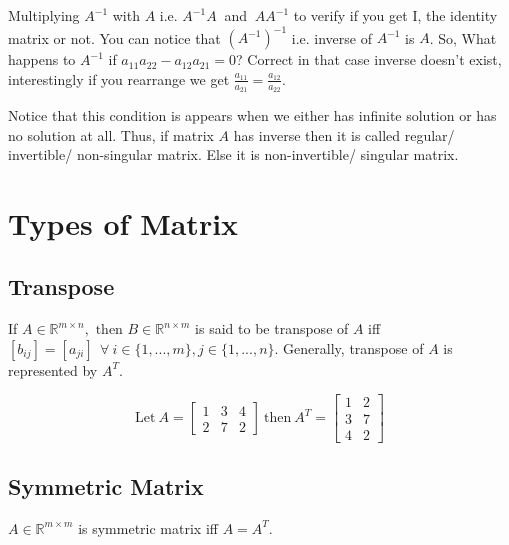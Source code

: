 \documentclass{article}
\begin{document}
Multiplying \( A^{-1} \) with \(A\) i.e. \( A^{-1} A ~ \) and \( ~ A  A^{-1} \) to verify if you get I, the identity matrix or not. You can notice that \((A^{-1})^{-1}\) i.e. inverse of \(A^{-1}\) is \(A\). So, What happens to \(A^{-1}\) if \(a_{11}a_{22} - a_{12}a_{21} = 0\)? Correct in that case inverse doesn't exist, interestingly if you rearrange we get \(\frac{a_{11}}{a_{21}} = \frac{a_{12}}{a_{22}}\).

Notice that this condition is appears when we either has infinite solution or has no solution at all. Thus, if matrix \(A\) has inverse then it is called regular/ invertible/ non-singular matrix. Else it is non-invertible/ singular matrix.

\section{Types of Matrix}
\subsection{Transpose}
If \(A \in \mathbb{R} ^{m \times n}, \text{ then } B \in \mathbb{R} ^{n\times m}\) is said to be transpose of \(A\) iff \([b_{ij}] = [a_{ji}]~~\forall~ i \in \{1,...,m\}, j\in\{1,...,n\}\). Generally, transpose of \(A\) is represented by \(A^T\).

\[\text{Let}~ A = \begin{bmatrix}
            1 & 3 & 4\\
            2 & 7 & 2
        \end{bmatrix} ~ \text{then} ~ A^{T} = \begin{bmatrix}
                                            1 & 2 \\
                                            3 & 7 \\
                                            4 & 2
                                       \end{bmatrix}\]

\subsection{Symmetric Matrix}
\(A \in \mathbb{R} ^{m\times m}\) is symmetric matrix iff \(A =A ^{T}\).\\
\end{document}
